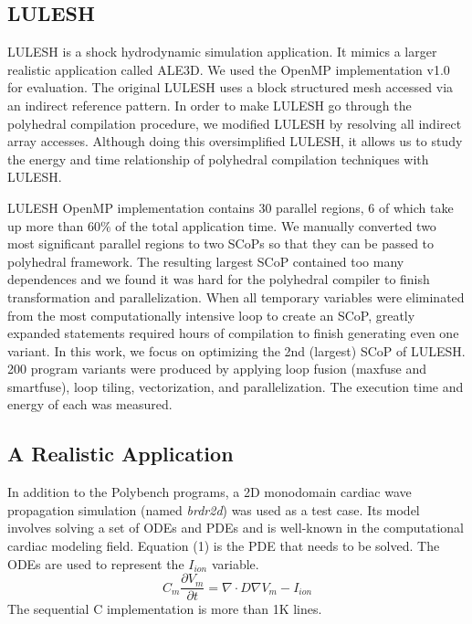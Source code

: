 \subsection{LULESH}
LULESH\cite{LULESH:versions} is a shock hydrodynamic simulation application. It
mimics a larger realistic application called ALE3D. We used the OpenMP implementation
v1.0 for evaluation. The original LULESH uses a 
block structured mesh accessed via an indirect reference pattern\cite{LULESH:versions}.
In order to make LULESH go through the polyhedral compilation procedure, we modified
LULESH by resolving all indirect array accesses. Although doing this oversimplified
LULESH, it allows us to study the energy and time relationship of polyhedral 
compilation techniques with LULESH. 

LULESH OpenMP implementation contains 30 parallel regions, 6 of which take up more
than $60\%$ of the total application time\cite{us}. We manually converted two most 
significant parallel regions to two SCoPs so that they can be passed to polyhedral
framework. The resulting largest SCoP contained too many dependences and we found
it was hard for the polyhedral compiler to finish transformation and parallelization.
When all temporary variables were eliminated from the most computationally intensive loop
to create an SCoP, greatly expanded statements required hours of compilation to finish generating even one variant.
In this work, we focus on optimizing 
the 2nd (largest) SCoP of LULESH. 200 program variants were produced 
by applying loop fusion (maxfuse and 
smartfuse), loop tiling, vectorization, and parallelization.
The execution time and energy of each was measured.

\subsection{A Realistic Application}
In addition to the Polybench programs, a 2D monodomain cardiac wave propagation simulation 
(named \emph{brdr2d}) was used as a test case. Its model involves
solving a set of ODEs and PDEs and is well-known in the computational 
cardiac modeling field\cite{Me}. Equation (1) is the PDE that needs to be 
solved. The ODEs are used to represent the $I_{ion}$ variable.
\begin{equation}
C_{m}\frac{\partial V_{m}}{\partial t} = \nabla \cdot D\nabla{V_{m}}-I_{ion}
\end{equation}
The sequential C implementation is more than 1K lines. 

